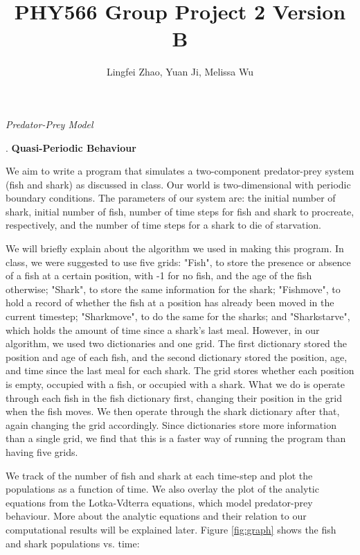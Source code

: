 \documentclass{article}
\begin{document}
\title{PHY566 Group Project 2 Version B}
\author{Lingfei Zhao, Yuan Ji, Melissa Wu}
\maketitle

\begin{center}
\textit{\large Predator-Prey Model}\par
\end{center}
\bigskip
{}. \textbf{Quasi-Periodic Behaviour}\par
\smallskip
We aim to write a program that simulates a two-component predator-prey system (fish and shark) as discussed in class. Our world is two-dimensional with periodic boundary conditions. The parameters of our system are: the initial number of shark, initial number of fish, number of time steps for fish and shark to procreate, respectively, and the number of time steps for a shark to die of starvation.\par
We will briefly explain about the algorithm we used in making this program. In class, we were suggested to use five grids: "Fish", to store the presence or absence of a fish at a certain position, with -1 for no fish, and the age of the fish otherwise; "Shark", to store the same information for the shark; "Fishmove", to hold a record of whether the fish at a position has already been moved in the current timestep; "Sharkmove", to do the same for the sharks; and "Sharkstarve", which holds the amount of time since a shark's last meal. However, in our algorithm, we used two dictionaries and one grid. The first dictionary stored the position and age of each fish, and the second dictionary stored the position, age, and time since the last meal for each shark. The grid stores whether each position is empty, occupied with a fish, or occupied with a shark. What we do is operate through each fish in the fish dictionary first, changing their position in the grid when the fish moves. We then operate through the shark dictionary after that, again changing the grid accordingly. Since dictionaries store more information than a single grid, we find that this is a faster way of running the program than having five grids.\par 
We track of the number of fish and shark at each time-step and plot the populations as a function of time. We also overlay the plot of the analytic equations from the Lotka-Vdterra equations, which model predator-prey behaviour. More about the analytic equations and their relation to our computational results will be explained later. Figure \ref{fig:graph} shows the fish and shark populations vs. time:\par
\end{document}
